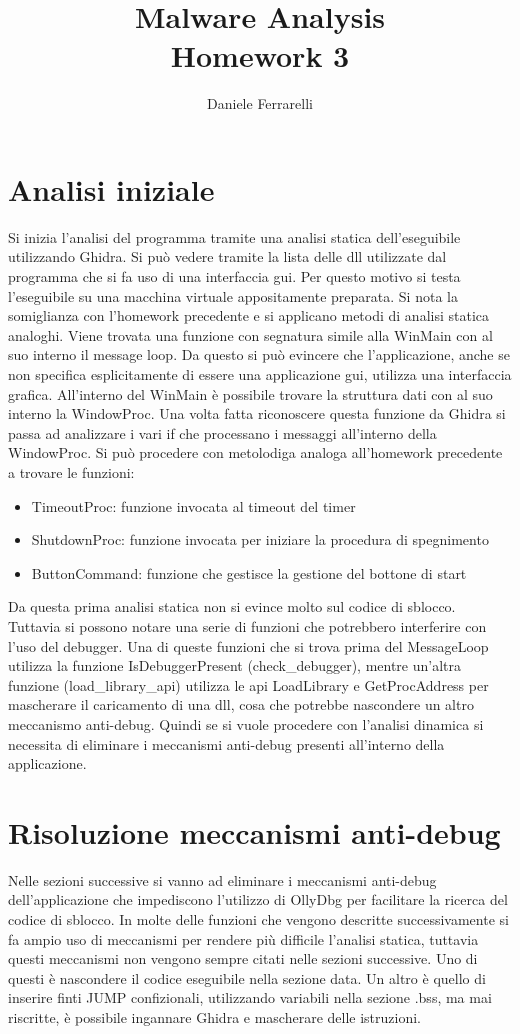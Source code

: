 \documentclass[a4paper,10pt]{article}
\title{Malware Analysis \\ \large Homework 3}
\author{Daniele Ferrarelli}
\date{}
\begin{document}
\maketitle

\section{Analisi iniziale}
Si inizia l'analisi del programma tramite una analisi statica dell'eseguibile utilizzando Ghidra. Si può vedere tramite la lista delle dll utilizzate dal programma che si fa uso di una interfaccia gui. Per questo motivo si testa l'eseguibile su una macchina virtuale appositamente preparata. Si nota la somiglianza con l'homework precedente e si applicano metodi di analisi statica analoghi. Viene trovata una funzione con segnatura simile alla WinMain con al suo interno il message loop. Da questo si può evincere che l'applicazione, anche se non specifica esplicitamente di essere una applicazione gui, utilizza una interfaccia grafica. All'interno del WinMain è possibile trovare la struttura dati con al suo interno la WindowProc. Una volta fatta riconoscere questa funzione da Ghidra si passa ad analizzare i vari if che processano i messaggi all'interno della WindowProc. Si può procedere con metolodiga analoga all'homework precedente a trovare le funzioni:
\begin{itemize}
\item TimeoutProc: funzione invocata al timeout del timer
\item ShutdownProc: funzione invocata per iniziare la procedura di spegnimento
\item ButtonCommand: funzione che gestisce la gestione del bottone di start
\end{itemize}
Da questa prima analisi statica non si evince molto sul codice di sblocco. Tuttavia si possono notare una serie di funzioni che potrebbero interferire con l'uso del debugger. Una di queste funzioni che si trova prima del MessageLoop utilizza la funzione IsDebuggerPresent (check\_debugger), mentre un'altra funzione (load\_library\_api) utilizza le api LoadLibrary e GetProcAddress per mascherare il caricamento di una dll, cosa che potrebbe nascondere un altro meccanismo anti-debug. Quindi se si vuole procedere con l'analisi dinamica si necessita di eliminare i meccanismi anti-debug presenti all'interno della applicazione. 

\section{Risoluzione meccanismi anti-debug}
Nelle sezioni successive si vanno ad eliminare i meccanismi anti-debug dell'applicazione che impediscono l'utilizzo di OllyDbg per facilitare la ricerca del codice di sblocco. In molte delle funzioni che vengono descritte successivamente si fa ampio uso di meccanismi per rendere più difficile l'analisi statica, tuttavia questi meccanismi non vengono sempre citati nelle sezioni successive. Uno di questi è nascondere il codice eseguibile nella sezione data. Un altro è quello di inserire finti JUMP confizionali, utilizzando variabili nella sezione .bss, ma mai riscritte, è possibile ingannare Ghidra e mascherare delle istruzioni.
\end{document}
